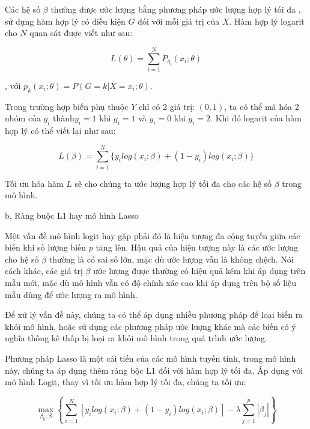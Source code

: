 \documentclass[a4paper]{report}\usepackage[]{graphicx}\usepackage[]{color}
\begin{document}
\vspace{5mm}


Các hệ số $\beta$ thường được ước lượng bằng phương pháp ước lượng hợp lý tối đa \parencite{hosmer2013applied}, sử dụng hàm hợp lý có điều kiện $G$ đối với mỗi giá trị của $X$. Hàm hợp lý logarit cho $N$ quan sát được viết như sau:

{\large

$$
L(\theta) = \sum_{i = 1}^N P_{g_i} (x_i; \theta)
$$
}
, với $p_k(x_i;\theta) = P(G = k|X = x_i; \theta)$.

Trong trường hợp biến phụ thuộc $Y$ chỉ có 2 giá trị: $(0, 1)$, ta có thể mã hóa 2 nhóm của $g_i$ thành$y_i = 1$ khi $g_i = 1$ và $y_i = 0$ khi $g_i = 2$. Khi đó logarit của hàm hợp lý có thể viết lại như  sau: 

{\large
$$
L(\beta) = \sum_{i = 1}^N \{  y_i log (x_i ; \beta) + (1- y_i)log (x_i; \beta) \}
$$
}

Tối ưu hóa hàm $L$ sẽ cho chúng ta ước lượng hợp lý tối đa cho các hệ số $\beta$ trong mô hình.

b, Ràng buộc L1 hay mô hình Lasso

\vspace{5mm}

Một vấn đề mô hình logit hay gặp phải đó là hiện tượng đa cộng tuyến giữa các biến khi số lượng biến $p$ tăng lên. Hậu quả của hiện tượng này là các ước lượng cho hệ số $\beta$ thường là có sai số lớn, mặc dù ước lượng vẫn là không chệch. Nói cách khác, các giá trị $\beta$ ước lượng được thường có hiệu quả kém khi áp dụng trên mẫu mới, mặc dù mô hình vẫn có độ chính xác cao khi áp dụng trên bộ số liệu mẫu dùng để ước lượng ra mô hình. 

Để xử lý vấn đề này, chúng ta có thể áp dụng nhiều phương pháp để loại biến ra khỏi mô hình, hoặc sử dụng các phương pháp ước lượng khác mà các biến có ý nghĩa thống kê thấp bị loại ra khỏi mô hình trong quá trình ước lượng.

Phương pháp Lasso là một cải tiến của các mô hình tuyến tính, trong mô hình này, chúng ta áp dụng thêm ràng bộc L1 đối với hàm hợp lý tối đa. Áp dụng với mô hình Logit, thay vì tối ưu hàm hợp lý tối đa, chúng ta tối ưu:

{\large
$$
\max_{\beta_0, \beta} \left \{ \sum_{i = 1}^N [ y_i log (x_i ; \beta) + (1- y_i)log (x_i; \beta)] - \lambda \sum_{j = 1}^p|\beta_j|\right \}
$$
}
\end{document}
